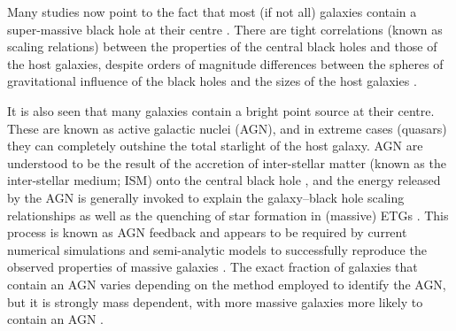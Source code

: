 	Many studies now point to the fact that most (if not all) galaxies contain a super-massive black hole at their centre \citep[e.g.][]{Kormendy2013a}. There are tight correlations (known as scaling relations) between the properties of the central black holes and those of the host galaxies, despite orders of magnitude differences between the spheres of gravitational influence of the black holes and the sizes of the host galaxies \citep[e.g.][]{Gudehus1973, Faber1976, Ferrarese2000, Gebhardt2000}. 

	It is also seen that many galaxies contain a bright point source at their centre. These are known as active galactic nuclei (AGN), and in extreme cases (quasars) they can completely outshine the total starlight of the host galaxy. AGN are understood to be the result of the accretion of  inter-stellar matter (known as the inter-stellar medium; ISM) onto the central black hole \citep[e.g.][]{Lynden-Bell1969}, and the energy released by the AGN is generally invoked to explain the galaxy--black hole scaling relationships \citep[e.g.][]{Raimundo2010} as well as the quenching of star formation in (massive) ETGs \citep[e.g.][]{Croton2006, Somerville2008}. This process is known as AGN feedback and appears to be required by current numerical simulations and semi-analytic models to successfully reproduce the observed properties of massive galaxies \citep[e.g.][]{Kauffmann2000, Granato2004, DiMatteo2005, Springel2005, Bower2006, Croton2006, Hopkins2006, Ciotti2010, Scannapieco2012}. The exact fraction of galaxies that contain an AGN varies depending on the method employed to identify the AGN, but it is strongly mass dependent, with more massive galaxies more likely to contain an AGN \citep[e.g.][]{Kauffmann2003a}.

